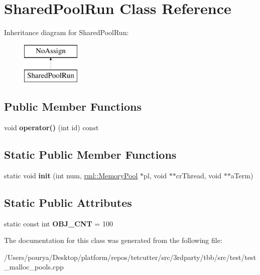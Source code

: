 \hypertarget{classSharedPoolRun}{}\section{Shared\+Pool\+Run Class Reference}
\label{classSharedPoolRun}
Inheritance diagram for Shared\+Pool\+Run\+:\begin{figure}[H]
\begin{center}
\leavevmode
\includegraphics[height=2.000000cm]{classSharedPoolRun}
\end{center}
\end{figure}
\subsection*{Public Member Functions}
\begin{DoxyCompactItemize}
\item 
\hypertarget{classSharedPoolRun_abcac2286ec1bbb70f904f3103cb3a133}{}void {\bfseries operator()} (int id) const \label{classSharedPoolRun_abcac2286ec1bbb70f904f3103cb3a133}

\end{DoxyCompactItemize}
\subsection*{Static Public Member Functions}
\begin{DoxyCompactItemize}
\item 
\hypertarget{classSharedPoolRun_a4812a931809543af2bf633cba6bd4419}{}static void {\bfseries init} (int num, \hyperlink{classrml_1_1internal_1_1MemoryPool}{rml\+::\+Memory\+Pool} $\ast$pl, void $\ast$$\ast$cr\+Thread, void $\ast$$\ast$a\+Term)\label{classSharedPoolRun_a4812a931809543af2bf633cba6bd4419}

\end{DoxyCompactItemize}
\subsection*{Static Public Attributes}
\begin{DoxyCompactItemize}
\item 
\hypertarget{classSharedPoolRun_ad90cbfc08cb17679262f0f40d9c26e0b}{}static const int {\bfseries O\+B\+J\+\_\+\+C\+N\+T} = 100\label{classSharedPoolRun_ad90cbfc08cb17679262f0f40d9c26e0b}

\end{DoxyCompactItemize}


The documentation for this class was generated from the following file\+:\begin{DoxyCompactItemize}
\item 
/\+Users/pourya/\+Desktop/platform/repos/tetcutter/src/3rdparty/tbb/src/test/test\+\_\+malloc\+\_\+pools.\+cpp\end{DoxyCompactItemize}
